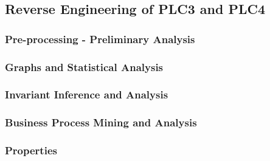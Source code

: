 \subsection{Reverse Engineering of PLC3 and PLC4}
\label{subsec:6_P3P4_analysis}

\subsubsection{Pre-processing - Preliminary Analysis}
\label{subsubsec:6_P3P4_preprocessing}

\subsubsection{Graphs and Statistical Analysis}
\label{subsubsec:6_P3P4_graphs}

\subsubsection{Invariant Inference and Analysis}
\label{subsubsec:6_P3P4_invariants}

\subsubsection{Business Process Mining and Analysis}
\label{subsubsec:6_P3P4_bpa}

\subsubsection{Properties}
\label{subsubsec:6_P3P4_summary_table}

\vfill
\nolinenumbers